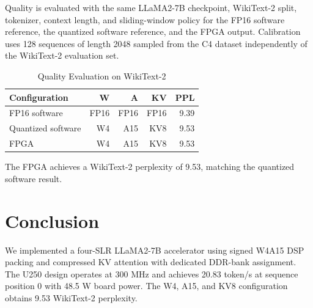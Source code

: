 \documentclass[conference]{IEEEtran}
\newcommand{\oursPerplexity} {9.53}
\begin{document}
Quality is evaluated with the same LLaMA2-7B checkpoint, WikiText-2 split,
tokenizer, context length, and sliding-window policy for the FP16 software
reference, the quantized software reference, and the FPGA output. Calibration
uses 128 sequences of length 2048 sampled from the C4 dataset independently of
the WikiText-2 evaluation set.

\begin{table}[!htbp]
\caption{Quality Evaluation on WikiText-2}
\label{tab:quality}
\centering
\scriptsize
\setlength{\tabcolsep}{3pt}
\begin{tabular}{lrrrr}
\toprule
Configuration      & W    & A    & KV   & PPL \\
\midrule
FP16 software      & FP16 & FP16 & FP16 & 9.39 \\
Quantized software & W4   & A15  & KV8  & 9.53 \\
FPGA               & W4   & A15  & KV8  & \oursPerplexity \\
\bottomrule
\end{tabular}
\end{table}

The FPGA achieves a WikiText-2 perplexity of \oursPerplexity{}, matching the
quantized software result.

\section{Conclusion}

We implemented a four-SLR LLaMA2-7B accelerator using signed W4A15 DSP packing
and compressed KV attention with dedicated DDR-bank assignment. The U250 design
operates at 300 MHz and achieves 20.83 token/s at sequence position 0 with
48.5 W board power. The W4, A15, and KV8 configuration obtains 9.53 WikiText-2
perplexity.
\end{document}
